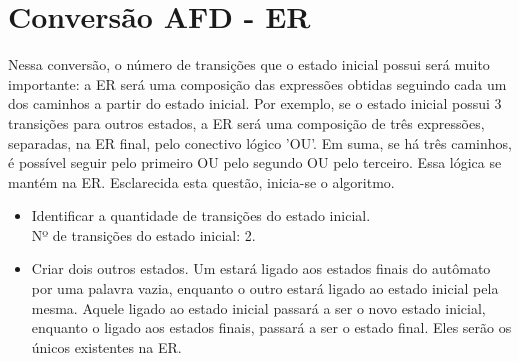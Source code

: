 \documentclass[a4paper,10pt]{article} %
\begin{document}
{\section{Conversão AFD - ER}
    Nessa conversão, o número de transições que o estado inicial possui será muito importante: a ER será uma composição das expressões obtidas seguindo cada um dos caminhos a partir do estado inicial. Por exemplo, se o estado inicial possui 3 transições para outros estados, a ER será uma composição de três expressões, separadas, na ER final, pelo conectivo lógico 'OU'. Em suma, se há três caminhos, é possível seguir pelo primeiro OU pelo segundo OU pelo terceiro. Essa lógica se mantém na ER. Esclarecida esta questão, inicia-se o algoritmo.
    \begin{itemize}
        \item Identificar a quantidade de transições do estado inicial.\\Nº de transições do estado inicial: 2.
        \item Criar dois outros estados. Um estará ligado aos estados finais do autômato por uma palavra vazia, enquanto o outro estará ligado ao estado inicial pela mesma. Aquele ligado ao estado inicial passará a ser o novo estado inicial, enquanto o ligado aos estados finais, passará a ser o estado final. Eles serão os únicos existentes na ER.
            \begin{center}
            \end{center}
    \end{itemize}

}
\end{document}
